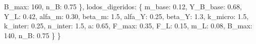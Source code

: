 \documentclass[
]{article}
\newenvironment{Shaded}{}{}
\newcommand{\DecValTok}[1]{\textcolor[rgb]{0.25,0.63,0.44}{#1}}
\newcommand{\FloatTok}[1]{\textcolor[rgb]{0.25,0.63,0.44}{#1}}
\newcommand{\NormalTok}[1]{#1}
\newcommand{\StringTok}[1]{\textcolor[rgb]{0.25,0.44,0.63}{#1}}
\begin{document}
\begin{Shaded}
\begin{Highlighting}[]
                \StringTok{\textquotesingle{}B\_max\textquotesingle{}}\NormalTok{: }\DecValTok{160}\NormalTok{, }\StringTok{\textquotesingle{}n\_B\textquotesingle{}}\NormalTok{: }\FloatTok{0.75}
\NormalTok{            \},}
            \StringTok{\textquotesingle{}lodos\_digeridos\textquotesingle{}}\NormalTok{: \{}
                \StringTok{\textquotesingle{}m\_base\textquotesingle{}}\NormalTok{: }\FloatTok{0.12}\NormalTok{, }\StringTok{\textquotesingle{}Y\_B\_base\textquotesingle{}}\NormalTok{: }\FloatTok{0.68}\NormalTok{, }\StringTok{\textquotesingle{}Y\_L\textquotesingle{}}\NormalTok{: }\FloatTok{0.42}\NormalTok{,}
                \StringTok{\textquotesingle{}alfa\_m\textquotesingle{}}\NormalTok{: }\FloatTok{0.30}\NormalTok{, }\StringTok{\textquotesingle{}beta\_m\textquotesingle{}}\NormalTok{: }\FloatTok{1.5}\NormalTok{,}
                \StringTok{\textquotesingle{}alfa\_Y\textquotesingle{}}\NormalTok{: }\FloatTok{0.25}\NormalTok{, }\StringTok{\textquotesingle{}beta\_Y\textquotesingle{}}\NormalTok{: }\FloatTok{1.3}\NormalTok{,}
                \StringTok{\textquotesingle{}k\_micro\textquotesingle{}}\NormalTok{: }\FloatTok{1.5}\NormalTok{, }\StringTok{\textquotesingle{}k\_inter\textquotesingle{}}\NormalTok{: }\FloatTok{0.25}\NormalTok{, }\StringTok{\textquotesingle{}n\_inter\textquotesingle{}}\NormalTok{: }\FloatTok{1.5}\NormalTok{,}
                \StringTok{\textquotesingle{}a\textquotesingle{}}\NormalTok{: }\FloatTok{0.65}\NormalTok{, }\StringTok{\textquotesingle{}F\_max\textquotesingle{}}\NormalTok{: }\FloatTok{0.35}\NormalTok{, }\StringTok{\textquotesingle{}F\_L\textquotesingle{}}\NormalTok{: }\FloatTok{0.15}\NormalTok{, }\StringTok{\textquotesingle{}m\_L\textquotesingle{}}\NormalTok{: }\FloatTok{0.08}\NormalTok{,}
                \StringTok{\textquotesingle{}B\_max\textquotesingle{}}\NormalTok{: }\DecValTok{140}\NormalTok{, }\StringTok{\textquotesingle{}n\_B\textquotesingle{}}\NormalTok{: }\FloatTok{0.75}
\NormalTok{            \}}
\NormalTok{        \}}
        

\end{Highlighting}
\end{Shaded}
\end{document}

